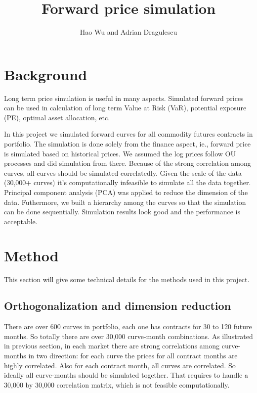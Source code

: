 \documentclass[12pt]{article}
\begin{document}
\title{Forward price simulation}
\author{Hao Wu and Adrian Dragulescu}
\maketitle

\section{Background}
Long term price simulation is useful in many aspects.
Simulated forward prices can be used in calculation of 
long term Value at Risk (VaR), potential exposure (PE), 
optimal asset allocation, etc. 

In this project we simulated forward curves for all 
commodity futures contracts in portfolio. 
The simulation is done solely from the finance aspect, ie.,
forward price is simulated based on historical prices. 
We assumed the log prices follow OU  processes
and did simulation from there. 
Because of the strong correlation among curves, 
all curves should be simulated correlatedly. 
Given the scale of the data (30,000+ curves)
it's computationally infeasible to simulate all the data
together. Principal component analysis (PCA) 
was applied to reduce the dimension of the data. 
Futhermore, we built a hierarchy among the curves
so that the simulation can be done sequentially. 
Simulation results look good and the performance
is acceptable.



\newpage
\section{Method}

This section will give some technical details for the methods
used in this project. 

\subsection{Orthogonalization and dimension reduction}

There are over 600 curves in portfolio, each one has contracts
for 30 to 120 future months. So totally there are over 30,000
curve-month combinations. As illustrated in previous section,
in each market there are strong correlations 
among curve-months in two direction:
for each curve the prices for all contract months are highly
correlated. Also for each contract month, all curves are correlated.
So ideally all curve-months should be simulated together.
That requires to handle a 30,000 by 30,000 correlation matrix,
which is not feasible computationally. 
\end{document}
